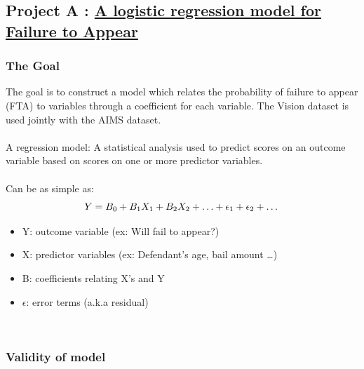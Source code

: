\documentclass{article}
\begin{document}
\subsection{Project A : \underline{A logistic regression model for Failure to Appear}}
\subsubsection{The Goal}
The goal is to construct a model which relates the probability of failure to appear (FTA) to variables through a coefficient for each variable. The Vision dataset is used jointly with the AIMS dataset. 
~\\
~\\
A regression model: A statistical analysis used to predict scores on an outcome
variable based on scores on one or more predictor variables.\\
~\\
Can be as simple as:
\begin{equation}
Y = B_{0} + B_{1}X_{1} + B_{2}X_{2} + \ldots + \epsilon_{1}+\epsilon_{2} + \ldots \\
\end{equation}
\begin{itemize}
\item Y: outcome variable (ex: Will fail to appear?)
\item X: predictor variables (ex: Defendant's age, bail amount \ldots)
\item B: coefficients relating X's and Y
\item $\epsilon$: error terms (a.k.a residual)
\end{itemize}
~\\


\subsubsection{Validity of model}
\end{document}
